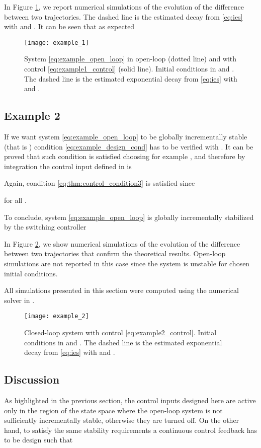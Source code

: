 \documentclass[letterpaper, 10 pt, conference]{ieeeconf}
\begin{document}
In Figure \ref{fig:example1_sim}, we report numerical simulations of the evolution of the difference between two trajectories. The dashed line is the estimated decay from \eqref{eq:ies} with  and . It can be seen that as expected


\begin{figure}[t]
\centering 
{\texttt{[image: example\_1]}}
\caption{System \eqref{eq:example_open_loop} in open-loop (dotted line) and with control \eqref{eq:example1_control} (solid line). Initial conditions in  and . The dashed line is the estimated exponential decay from \eqref{eq:ies} with  and . } 
\label{fig:example1_sim}
\end{figure}

\subsection{Example 2}
\label{sec:example_2}
If we want system \eqref{eq:example_open_loop} to be globally incrementally stable (that is ) condition \eqref{eq:example_design_cond} has to be verified with . It can be proved that such condition is satisfied choosing for example , and therefore by integration the control input defined in  is



Again, condition \eqref{eq:thm:control_condition3} is satisfied since

for all .

To conclude, system \eqref{eq:example_open_loop} is globally incrementally stabilized by the switching controller

In Figure \ref{fig:example2_sim}, we show numerical simulations of the evolution of the difference between two trajectories that confirm the theoretical results. Open-loop simulations are not reported in this case since the system is unstable for chosen initial conditions.

All simulations presented in this section were computed using the numerical solver in \cite{piiroinen2008event}.
\begin{figure}[t]
\centering 
{\texttt{[image: example\_2]}}
\caption{Closed-loop system with control \eqref{eq:example2_control}. Initial conditions in  and . The dashed line is the estimated exponential decay from \eqref{eq:ies} with  and .} 
\label{fig:example2_sim}
\end{figure}



\subsection{Discussion}
As highlighted in the previous section, the control inputs designed here are active only in the region  of the state space where the open-loop system is not sufficiently incrementally stable, otherwise they are turned off. On the other hand, to satisfy the same stability requirements a continuous control feedback  has to be design such that
\end{document}
